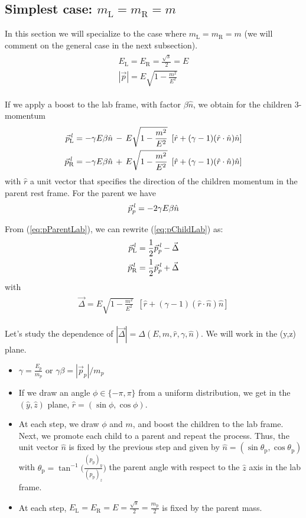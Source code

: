 \documentclass[12pt]{article}
\newcommand{\bea}{\begin{eqnarray}\begin{aligned}}
\newcommand{\eea}{\end{aligned}\end{eqnarray}}
\begin{document}
\subsection{Simplest case:  $m_{\text{L}}=m_{\text{R}}=m$}
In this section we will specialize to the case where $m_{\text{L}}=m_{\text{R}}=m$ (we will comment on the general case in the next subsection).
\bea
E_{\text{L}}=E_{\text{R}}=\frac{\sqrt{s}}{2} = E \\
|\vec{p}| =E \sqrt{1-\frac{m^2}{E^2}}
\eea


If we  apply a boost to the lab frame, with factor $\beta \hat{n}$, we obtain for the children 3-momentum
\bea\label{eq:pChildLab}
\vec{p}^{\it{\,l}}_{\text{L}} = - \gamma E \beta \hat{n} \,-\,  E \sqrt{1-\frac{m^2}{E^2}} \,\,\,[ \hat{r} + (\gamma -1) (\hat{r} \cdot \hat{n}) \hat{n} ] \\
\vec{p}^{\it{\,l}}_{\text{R}}= - \gamma E \beta \hat{n} \,+\,  E \sqrt{1-\frac{m^2}{E^2}} \,\,\,[ \hat{r} + (\gamma -1) (\hat{r} \cdot \hat{n}) \hat{n} ]
\eea
with $\hat{r}$ a unit vector that specifies the direction of the children momentum in the parent rest frame. For the parent we have 
\bea\label{eq:pParentLab}
\vec{p}^{\it{\,l}}_p= - 2 \gamma E \beta \hat{n} 
\eea

From (\ref{eq:pParentLab}), we can rewrite (\ref{eq:pChildLab}) as:
\bea\label{eq:pChildLab2}
\vec{p}^{\it{\,l}}_{\text{L}}= \frac{1}{2} \vec{p}^{\it{\,l}}_p - \vec{\Delta}  \\
\vec{p}^{\it{\,l}}_{\text{R}}= \frac{1}{2} \vec{p}^{\it{\,l}}_p + \vec{\Delta}
\eea
with
\bea\label{eq:delta}
 \vec{\Delta}   = E \sqrt{1-\frac{m^2}{E^2}} \,\,\,[ \hat{r} + (\gamma -1) (\hat{r} \cdot \hat{n}) \hat{n} ] 
\eea

Let's study the dependence of $|\vec{\Delta}|=\Delta(E,m,\hat{r},\gamma,\hat{n})$. We will work in the (y,z) plane.

\begin{itemize}
\item $\gamma=\frac{E_p}{m_p}$ or $\gamma \beta = |\vec{p}_p|/m_p$
\item If we draw an angle $\phi \in \{-\pi,\pi\}$ from a uniform distribution, we get in the $(\hat{y},\hat{z})$ plane,  $\hat{r}= (\sin{\phi}, \cos{\phi})$.

\item At each step, we draw $\phi$ and $m$, and boost the children to the lab frame. Next, we promote each child to a parent and repeat the process. Thus, the unit vector $\hat{n}$ is fixed by the previous step and given by $\hat{n}=(\sin{\theta_\text{p}}, \cos{\theta_\text{p}})$ with $\theta_\text{p}=\tan^{-1}\bigg({\frac{(p_{\text{p}})_y}{(p_{\text{p}})_z}}\bigg)$ the parent angle with respect to the $\hat{z}$ axis in the lab frame. 

\item At each step, $E_{\text{L}}=E_{\text{R}}=E =\frac{\sqrt{s}}{2}= \frac{m_{\text{p}}}{2}$ is fixed by the parent mass.

\end{itemize}
\end{document}
